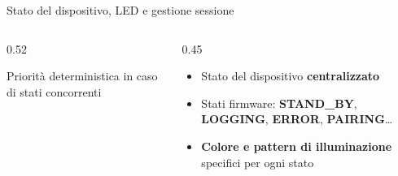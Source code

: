 \documentclass[aspectratio=169]{beamer}
\begin{document}
\begin{frame}{Stato del dispositivo, LED e gestione sessione}
\begin{columns}[T,onlytextwidth]
\begin{column}{0.52\textwidth}
\begin{tikzpicture}
      \end{tikzpicture}

      \vspace{5pt}

      \begin{center}
        {\tiny Priorità deterministica in caso di stati concorrenti}
      \end{center}

    \end{column}

    \begin{column}{0.45\textwidth}

      \begin{itemize}
        \item Stato del dispositivo \textbf{centralizzato}
        \item Stati firmware: \textbf{STAND\_BY}, \textbf{LOGGING},
              \textbf{ERROR}, \textbf{PAIRING}\dots
        \item \textbf{Colore e pattern di illuminazione}
              specifici per ogni stato
      \end{itemize}

    \end{column}

  \end{columns}
\end{frame}
\end{document}
